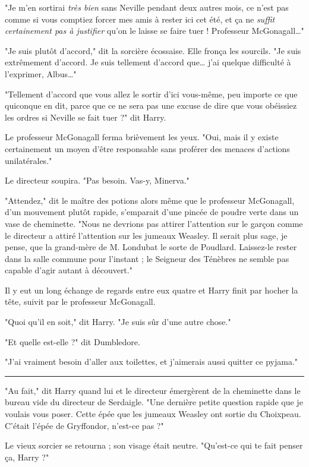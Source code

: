"Je m'en sortirai \emph{très bien}  sans Neville pendant deux autres mois, ce n'est pas comme si vous comptiez forcer mes amis à rester ici cet été, et ça ne \emph{suffit certainement pas à justifier}  qu'on le laisse se faire tuer ! Professeur McGonagall…"

"Je suis plutôt d'accord," dit la sorcière écossaise. Elle fronça les sourcils. "Je suis extrêmement d'accord. Je suis tellement d'accord que… j'ai quelque difficulté à l'exprimer, Albus…"

"Tellement d'accord que vous allez le sortir d'ici vous-même, peu importe ce que quiconque en dit, parce que ce ne sera pas une excuse de dire que vous obéissiez les ordres si Neville se fait tuer ?" dit Harry.

Le professeur McGonagall ferma brièvement les yeux. "Oui, mais il y existe certainement un moyen d'être responsable sans proférer des menaces d'actions unilatérales."

Le directeur soupira. "Pas besoin. Vas-y, Minerva."

"Attendez," dit le maître des potions alors même que le professeur McGonagall, d'un mouvement plutôt rapide, s'emparait d'une pincée de poudre verte dans un vase de cheminette. "Nous ne devrions pas attirer l'attention sur le garçon comme le directeur a attiré l'attention sur les jumeaux Weasley. Il serait plus sage, je pense, que la grand-mère de M. Londubat le sorte de Poudlard. Laissez-le rester dans la salle commune pour l'instant ; le Seigneur des Ténèbres ne semble pas capable d'agir autant à découvert."

Il y eut un long échange de regards entre eux quatre et Harry finit par hocher la tête, suivit par le professeur McGonagall.

"Quoi qu'il en soit," dit Harry. "Je suis sûr d'une autre chose."

"Et quelle est-elle ?" dit Dumbledore.

"J'ai vraiment besoin d'aller aux toilettes, et j'aimerais aussi quitter ce pyjama."
\par\noindent\rule{\textwidth}{0.4pt}
"Au fait," dit Harry quand lui et le directeur émergèrent de la cheminette dans le bureau vide du directeur de Serdaigle. "Une dernière petite question rapide que je voulais vous poser. Cette épée que les jumeaux Weasley ont sortie du Choixpeau. C'était l'épée de Gryffondor, n'est-ce pas ?"

Le vieux sorcier se retourna ; son visage était neutre. "Qu'est-ce qui te fait penser ça, Harry ?"

